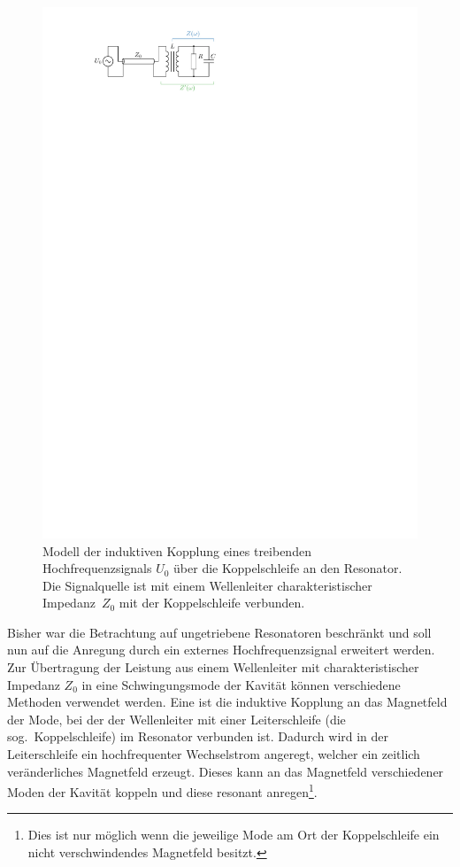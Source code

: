 \begin{figure}[h]
  \centering
  \includegraphics[scale=1.4]{./figs/RLC_coupling.pdf}
  \caption{Modell der induktiven Kopplung eines treibenden Hochfrequenzsignals $U_0$ über die Koppelschleife an den Resonator. Die Signalquelle ist mit einem Wellenleiter charakteristischer Impedanz~$Z_0$ mit der Koppelschleife verbunden. }
  \label{fig:rlc_coupling}
\end{figure}
Bisher war die Betrachtung auf ungetriebene Resonatoren beschränkt und soll nun auf die Anregung durch ein externes Hochfrequenzsignal erweitert werden.
Zur Übertragung der Leistung aus einem Wellenleiter mit charakteristischer Impedanz $Z_0$ in eine Schwingungsmode der Kavität können verschiedene Methoden verwendet werden.
Eine ist die induktive Kopplung an das Magnetfeld der Mode, bei der der Wellenleiter mit einer Leiterschleife (die sog.\ Koppelschleife) im Resonator verbunden ist.
Dadurch wird in der Leiterschleife ein hochfrequenter Wechselstrom angeregt, welcher ein zeitlich veränderliches Magnetfeld erzeugt. Dieses kann an das Magnetfeld verschiedener Moden der Kavität koppeln und diese resonant anregen\footnote{Dies ist nur möglich wenn die jeweilige Mode am Ort der Koppelschleife ein nicht verschwindendes Magnetfeld besitzt.}.

